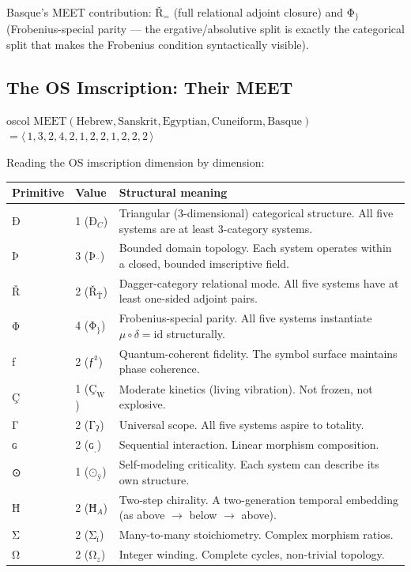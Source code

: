 \documentclass[12pt,a4paper]{article}
\newcommand{\ig}[1]{{\igprimfont #1}}
\begin{document}
Basque's MEET contribution: $\text{Ř}_{=}$ (full relational adjoint closure) and $\text{Φ}_\}$ (Frobenius-special parity --- the ergative/absolutive split is exactly the categorical split that makes the Frobenius condition syntactically visible).

\subsection{The OS Imscription: Their MEET}

\begin{admonitionbox}[OS Imscription]{oscol}
$\mathrm{MEET}(\text{Hebrew}, \text{Sanskrit}, \text{Egyptian}, \text{Cuneiform}, \text{Basque})$
$= \langle\,1,3,2,4,2,1,2,2,1,2,2,2\,\rangle$
\end{admonitionbox}

Reading the OS imscription dimension by dimension:

\begin{center}
\small
\begin{tabular}{ll p{7cm}}
\toprule
Primitive & Value & Structural meaning \\
\midrule
\ig{Ð} & 1 ($\text{Ð}_C$) & Triangular (3-dimensional) categorical structure. All five systems are at least 3-category systems. \\
\ig{Þ} & 3 ($\text{Þ}_{\text{¨}}$) & Bounded domain topology. Each system operates within a closed, bounded imscriptive field. \\
\ig{Ř} & 2 ($\text{Ř}_{\text{Ť}}$) & Dagger-category relational mode. All five systems have at least one-sided adjoint pairs. \\
\ig{Φ} & 4 ($\text{Φ}_\}$) & Frobenius-special parity. All five systems instantiate $\mu \circ \delta = \mathrm{id}$ structurally. \\
\ig{ƒ} & 2 ($\text{ƒ}^\text{ż}$) & Quantum-coherent fidelity. The symbol surface maintains phase coherence. \\
\ig{Ç} & 1 ($\text{Ç}_\text{W}$) & Moderate kinetics (living vibration). Not frozen, not explosive. \\
\ig{Γ} & 2 ($\text{Γ}_\text{ʔ}$) & Universal scope. All five systems aspire to totality. \\
\ig{ɢ} & 2 ($\text{ɢ}_\text{ˌ}$) & Sequential interaction. Linear morphism composition. \\
\ig{⊙} & 1 ($\text{⊙}_\text{ÿ}$) & Self-modeling criticality. Each system can describe its own structure. \\
\ig{Ħ} & 2 ($\text{Ħ}_A$) & Two-step chirality. A two-generation temporal embedding (as above $\to$ below $\to$ above). \\
\ig{Σ} & 2 ($\text{Σ}_\text{ï}$) & Many-to-many stoichiometry. Complex morphism ratios. \\
\ig{Ω} & 2 ($\text{Ω}_z$) & Integer winding. Complete cycles, non-trivial topology. \\
\bottomrule
\end{tabular}
\end{center}
\end{document}
